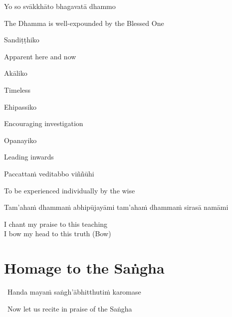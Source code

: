 Yo so svākkhāto bhagavatā dhammo

\begin{english}
  The Dhamma is well-expounded by the Blessed One
\end{english}

Sandiṭṭhiko

\begin{english}
  Apparent here and now
\end{english}

Akāliko

\begin{english}
  Timeless
\end{english}

Ehipassiko

\begin{english}
  Encouraging investigation
\end{english}

Opanayiko

\begin{english}
  Leading inwards
\end{english}

Paccattaṁ veditabbo viññūhi

\begin{english}
  To be experienced individually by the wise
\end{english}

\suttaRef{[SN 12.41]}

\begin{pali-hang}
  Tam'ahaṁ dhammaṁ abhipūjayāmi tam'ahaṁ dhammaṁ sirasā namāmi
\end{pali-hang}

\begin{english}
  I chant my praise to this teaching\\
  I bow my head to this truth \hfill{\textnormal{\fontsize{12.5}{18}\selectfont (Bow)}}
\end{english}

\suttaRef{[Trad]}



\section{Homage to the Saṅgha}
\label{homage-sangha}

\begin{leader}
  \anglebracketleft\ \hspace{-0.5mm}Handa mayaṁ saṅgh'ābhitthutiṁ karomase \hspace{-0.5mm}\anglebracketright\
\end{leader}
\begin{leader-english-belowpali}
  \anglebracketleft\ \hspace{-0.5mm}Now let us recite in praise of the Saṅgha \hspace{-0.5mm}\anglebracketright\
\end{leader-english-belowpali}

